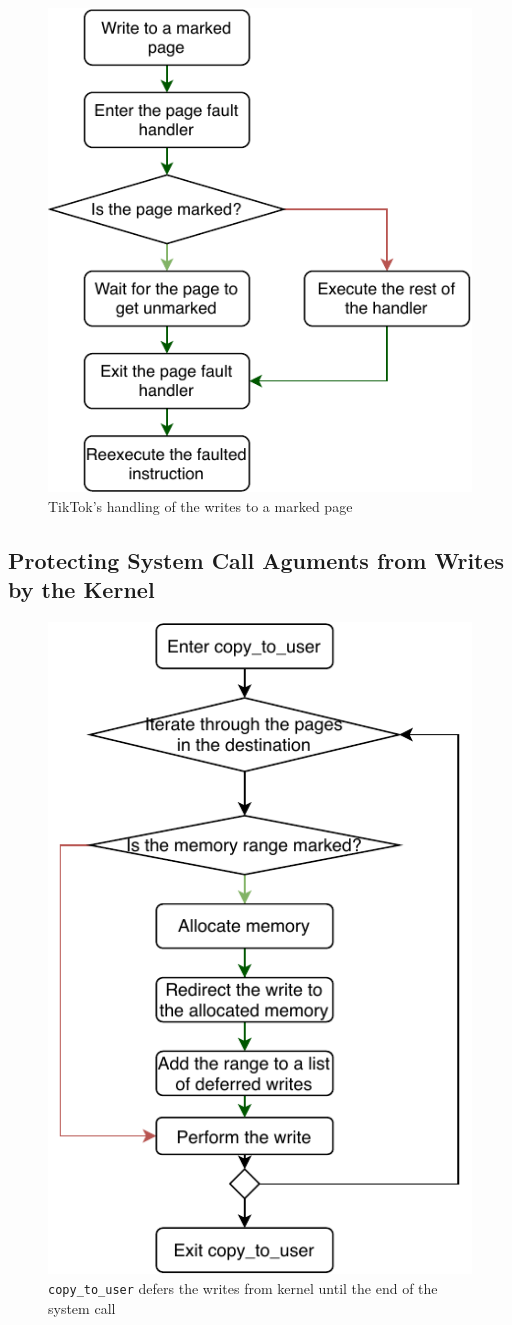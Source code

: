 \begin{figure}[]
  \centering
  \includegraphics[width = .75 \linewidth]{img/pagefault.pdf}
  \caption{TikTok's handling of the writes to a marked page}
  \label{fig:pagefault}
\end{figure}

\subsection{Protecting System Call Aguments from Writes by the Kernel}
\label{subsec:kernelland}
\begin{figure}[]
  \centering
  \includegraphics[width = .30 \textwidth]{img/copy_to_user.pdf}
  \caption{\texttt{copy\_to\_user} defers the writes from kernel until the end
  of the system call}
  \label{fig:copytouser}
\end{figure}

